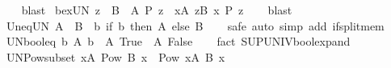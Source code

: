 \begin{isabellebody}
%
\isadelimproof
\ \ %
\endisadelimproof
%
\isatagproof
{}\isamarkupfalse%
\ blast%
\endisatagproof
{\isafoldproof}%
%
\isadelimproof
\isanewline
%
\endisadelimproof
\isanewline
{}\isamarkupfalse%
\ bex{\isacharunderscore}{\kern0pt}UN{\isacharcolon}{\kern0pt}\ {\isachardoublequoteopen}{\isacharparenleft}{\kern0pt}{\isasymexists}z\ {\isasymin}\ {\isasymUnion}{\isacharparenleft}{\kern0pt}B\ {\isacharbackquote}{\kern0pt}\ A{\isacharparenright}{\kern0pt}{\isachardot}{\kern0pt}\ P\ z{\isacharparenright}{\kern0pt}\ {\isasymlongleftrightarrow}\ {\isacharparenleft}{\kern0pt}{\isasymexists}x{\isasymin}A{\isachardot}{\kern0pt}\ {\isasymexists}z{\isasymin}B\ x{\isachardot}{\kern0pt}\ P\ z{\isacharparenright}{\kern0pt}{\isachardoublequoteclose}\isanewline
%
\isadelimproof
\ \ %
\endisadelimproof
%
\isatagproof
{}\isamarkupfalse%
\ blast%
\endisatagproof
{\isafoldproof}%
%
\isadelimproof
\isanewline
%
\endisadelimproof
\isanewline
{}\isamarkupfalse%
\ Un{\isacharunderscore}{\kern0pt}eq{\isacharunderscore}{\kern0pt}UN{\isacharcolon}{\kern0pt}\ {\isachardoublequoteopen}A\ {\isasymunion}\ B\ {\isacharequal}{\kern0pt}\ {\isacharparenleft}{\kern0pt}{\isasymUnion}b{\isachardot}{\kern0pt}\ if\ b\ then\ A\ else\ B{\isacharparenright}{\kern0pt}{\isachardoublequoteclose}\isanewline
%
\isadelimproof
\ \ %
\endisadelimproof
%
\isatagproof
{}\isamarkupfalse%
\ safe\ {\isacharparenleft}{\kern0pt}auto\ simp\ add{\isacharcolon}{\kern0pt}\ if{\isacharunderscore}{\kern0pt}split{\isacharunderscore}{\kern0pt}mem{}{\isacharparenright}{\kern0pt}%
\endisatagproof
{\isafoldproof}%
%
\isadelimproof
\isanewline
%
\endisadelimproof
\isanewline
{}\isamarkupfalse%
\ UN{\isacharunderscore}{\kern0pt}bool{\isacharunderscore}{\kern0pt}eq{\isacharcolon}{\kern0pt}\ {\isachardoublequoteopen}{\isacharparenleft}{\kern0pt}{\isasymUnion}b{\isachardot}{\kern0pt}\ A\ b{\isacharparenright}{\kern0pt}\ {\isacharequal}{\kern0pt}\ {\isacharparenleft}{\kern0pt}A\ True\ {\isasymunion}\ A\ False{\isacharparenright}{\kern0pt}{\isachardoublequoteclose}\isanewline
%
\isadelimproof
\ \ %
\endisadelimproof
%
\isatagproof
{}\isamarkupfalse%
\ {\isacharparenleft}{\kern0pt}fact\ SUP{\isacharunderscore}{\kern0pt}UNIV{\isacharunderscore}{\kern0pt}bool{\isacharunderscore}{\kern0pt}expand{\isacharparenright}{\kern0pt}%
\endisatagproof
{\isafoldproof}%
%
\isadelimproof
\isanewline
%
\endisadelimproof
\isanewline
{}\isamarkupfalse%
\ UN{\isacharunderscore}{\kern0pt}Pow{\isacharunderscore}{\kern0pt}subset{\isacharcolon}{\kern0pt}\ {\isachardoublequoteopen}{\isacharparenleft}{\kern0pt}{\isasymUnion}x{\isasymin}A{\isachardot}{\kern0pt}\ Pow\ {\isacharparenleft}{\kern0pt}B\ x{\isacharparenright}{\kern0pt}{\isacharparenright}{\kern0pt}\ {\isasymsubseteq}\ Pow\ {\isacharparenleft}{\kern0pt}{\isasymUnion}x{\isasymin}A{\isachardot}{\kern0pt}\ B\ x{\isacharparenright}{\kern0pt}{\isachardoublequoteclose}\isanewline

\end{isabellebody}

